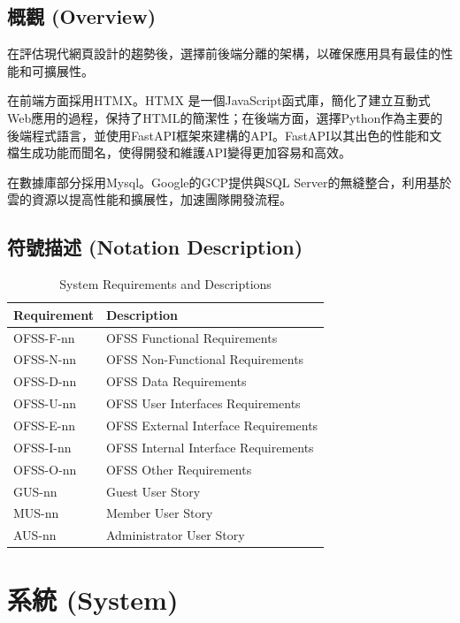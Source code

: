 \documentclass[a4paper, 12pt]{article}
\begin{document}
\subsection{概觀 (Overview)}
在評估現代網頁設計的趨勢後，選擇前後端分離的架構，以確保應用具有最佳的性能和可擴展性。

在前端方面採用HTMX。HTMX 是一個JavaScript函式庫，簡化了建立互動式Web應用的過程，保持了HTML的簡潔性；在後端方面，選擇Python作為主要的後端程式語言，並使用FastAPI框架來建構的API。FastAPI以其出色的性能和文檔生成功能而聞名，使得開發和維護API變得更加容易和高效。

在數據庫部分採用Mysql。Google的GCP提供與SQL Server的無縫整合，利用基於雲的資源以提高性能和擴展性，加速團隊開發流程。

\subsection{符號描述 (Notation Description)}

\begin{table}[h]
    \centering
    \renewcommand{\arraystretch}{1.35}
    \begin{tabular}{|p{3cm}|p{10cm}|}
        \hline
        \textbf{Requirement} & \textbf{Description} \\
        \hline
        OFSS-F-nn & OFSS Functional Requirements \\
        \hline
        OFSS-N-nn & OFSS Non-Functional Requirements \\
        \hline
        OFSS-D-nn & OFSS Data Requirements \\
        \hline
        OFSS-U-nn & OFSS User Interfaces Requirements \\
        \hline
        OFSS-E-nn & OFSS External Interface Requirements \\
        \hline
        OFSS-I-nn & OFSS Internal Interface Requirements \\
        \hline
        OFSS-O-nn & OFSS Other Requirements \\
        \hline
        GUS-nn & Guest User Story \\
        \hline
        MUS-nn & Member User Story \\
        \hline
        AUS-nn & Administrator User Story \\
        \hline
    \end{tabular}
    \caption{System Requirements and Descriptions}
    \label{tab:system-requirements}
\end{table}
\newpage
\section{系統 (System)}
\end{document}
